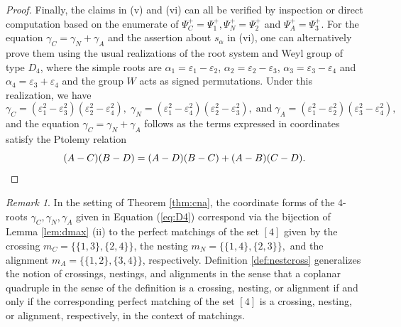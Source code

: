 \documentclass[11pt]{amsart}
\theoremstyle{plain}
\theoremstyle{definition}
\theoremstyle{remark}
\newtheorem{rmk}[theorem]{Remark}
\numberwithin{equation}{subsection}
\newcommand{\al}{\alpha}
\newcommand{\ep}{\varepsilon}
\begin{document}
\begin{proof}
Finally, the claims in (v) and (vi) can all be verified by inspection or direct
computation based on the enumerate of $\Psi^+_C=\Psi^+_1, \Psi^+_N=\Psi^+_2$
and $\Psi^+_A=\Psi^+_3$. For the equation $\gamma_C=\gamma_N+\gamma_A$ and the
assertion about $s_\al$ in (vi), one can alternatively prove them using the
usual realizations of the root system and Weyl group of type $D_4$, where the
simple roots are $\al_1 = \ep_1 - \ep_2$, $\al_2 = \ep_2 - \ep_3$, $\al_3 =
\ep_3 - \ep_4$ and $\al_4 = \ep_3 + \ep_4$ and the group $W$ acts as signed
permutations.  Under this realization, we have \begin{equation}
\label{eq:D4} \gamma_C = (\ep_1^2 - \ep_3^2)(\ep_2^2 - \ep_4^2),\;
      \gamma_N=(\ep_1^2 - \ep_4^2)(\ep_2^2 - \ep_3^2),\;\text{and}\;
  \gamma_A=(\ep_1^2 - \ep_2^2)(\ep_3^2 - \ep_4^2), \end{equation} and the
  equation $\gamma_C=\gamma_N+\gamma_A$ follows as the terms expressed in
  coordinates satisfy the Ptolemy relation \[ (A-C)(B-D) = (A-D)(B-C) +
  (A-B)(C-D).  \qedhere \]
\end{proof}


\begin{rmk}\label{rmk:cna}
In the setting of Theorem \ref{thm:cna}, the coordinate forms of the $4$-roots
$\gamma_C, \gamma_N, \gamma_A$  given in Equation (\ref{eq:D4}) correspond  via
the bijection of Lemma \ref{lem:dmax} (ii) to the perfect matchings of the set
$[4]$ given by the crossing $m_C=\{\{1,3\}, \{2,4\}\}$, the nesting
$m_N=\{\{1,4\},\{2,3\}\},$ and the alignment $m_A=\{\{1,2\}, \{3,4\}\}$,
respectively.  Definition \ref{def:nestcross} generalizes the notion of
crossings, nestings, and alignments in the sense that a coplanar quadruple in
the sense of the definition is a crossing, nesting, or alignment if and only if
the corresponding perfect matching of the set $[4]$ is a crossing, nesting, or
alignment, respectively, in the context of matchings.
\end{rmk}
\end{document}
